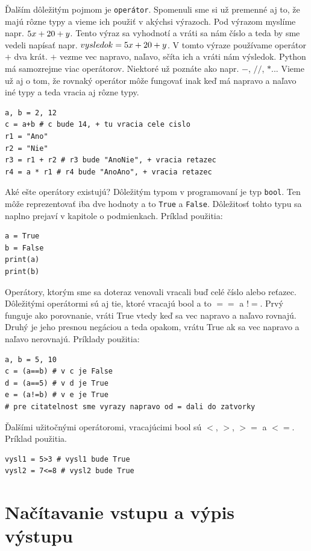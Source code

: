 \documentclass{article}
\begin{document}
Ďalším dôležitým pojmom je \texttt{operátor}. Spomenuli sme si už premenné aj to, že majú rôzne typy a vieme ich použiť v akýchsi výrazoch. Pod výrazom myslíme napr. $5\*x + 20 + y$. Tento výraz sa vyhodnotí a vráti sa nám číslo a teda by sme vedeli napísať napr. $vysledok = 5\*x + 20 + y$. V tomto výraze používame operátor $+$ dva krát. $+$ vezme vec napravo, naľavo, sčíta ich a vráti nám výsledok. Python má samozrejme viac operátorov. Niektoré už poznáte ako napr. $-$, $//$, $*$... Vieme už aj o tom, že rovnaký operátor môže fungovať inak keď má napravo a naľavo iné typy a teda vracia aj rôzne typy.

\begin{lstlisting}
a, b = 2, 12
c = a+b # c bude 14, + tu vracia cele cislo
r1 = "Ano"
r2 = "Nie"
r3 = r1 + r2 # r3 bude "AnoNie", + vracia retazec
r4 = a * r1 # r4 bude "AnoAno", + vracia retazec
\end{lstlisting}

Aké ešte operátory existujú? Dôležitým typom v programovaní je typ \texttt{bool}. Ten môže reprezentovať iba dve hodnoty a to \texttt{True} a \texttt{False}. Dôležitosť tohto typu sa naplno prejaví v kapitole o podmienkach. Príklad použitia:

\begin{lstlisting}
a = True
b = False
print(a)
print(b)
\end{lstlisting}

Operátory, ktorým sme sa doteraz venovali vracali buď celé číslo alebo reťazec. Dôležitými operátormi sú aj tie, ktoré vracajú bool a to $==$ a $!=$. Prvý funguje ako porovnanie, vráti True vtedy keď sa vec napravo a naľavo rovnajú. Druhý je jeho presnou negáciou a teda opakom, vrátu True ak sa vec napravo a naľavo nerovnajú. Príklady použitia:

\begin{lstlisting}
a, b = 5, 10
c = (a==b) # v c je False
d = (a==5) # v d je True
e = (a!=b) # v e je True
# pre citatelnost sme vyrazy napravo od = dali do zatvorky
\end{lstlisting}

Ďalšími užitočnými operátoromi, vracajúcimi bool sú $<$, $>$, $>=$ a $<=$. Príklad použitia.

\begin{lstlisting}
vysl1 = 5>3 # vysl1 bude True
vysl2 = 7<=8 # vysl2 bude True
\end{lstlisting}

\section{Načítavanie vstupu a výpis výstupu}
\end{document}
